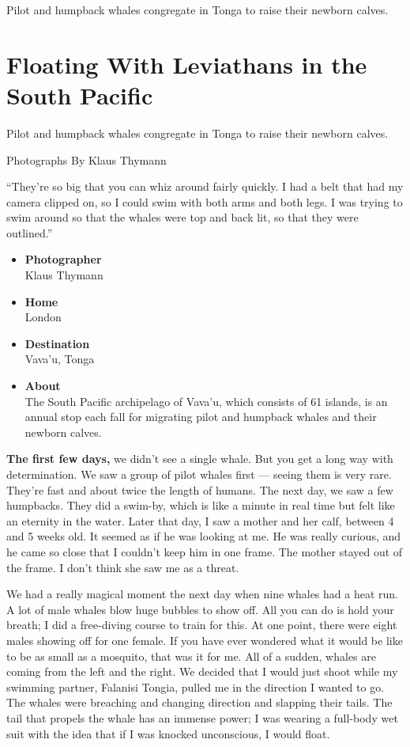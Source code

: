 Pilot and humpback whales congregate in Tonga to raise their newborn
calves.

\hypertarget{floating-with-leviathans-in-the-south-pacific-1}{%
\section{Floating With Leviathans in the South
Pacific}\label{floating-with-leviathans-in-the-south-pacific-1}}

Pilot and humpback whales congregate in Tonga to raise their newborn
calves.

Photographs By Klaus Thymann

``They're so big that you can whiz around fairly quickly. I had a belt
that had my camera clipped on, so I could swim with both arms and both
legs. I was trying to swim around so that the whales were top and back
lit, so that they were outlined.''~

\begin{itemize}
\tightlist
\item
  \textbf{Photographer}\\
  Klaus Thymann
\item
  \textbf{Home}\\
  London
\item
  \textbf{Destination}\\
  Vava'u, Tonga
\item
  \textbf{About}\\
  The South Pacific archipelago of Vava'u, which consists of 61 islands,
  is an annual stop each fall for migrating pilot and humpback whales
  and their newborn calves.
\end{itemize}

\textbf{The first few days,} we didn't see a single whale. But you get a
long way with determination. We saw a group of pilot whales first ---
seeing them is very rare. They're fast and about twice the length of
humans. The next day, we saw a few humpbacks. They did a swim-by, which
is like a minute in real time but felt like an eternity in the water.
Later that day, I saw a mother and her calf, between 4 and 5 weeks old.
It seemed as if he was looking at me. He was really curious, and he came
so close that I couldn't keep him in one frame. The mother stayed out of
the frame. I don't think she saw me as a threat.

We had a really magical moment the next day when nine whales had a heat
run. A lot of male whales blow huge bubbles to show off. All you can do
is hold your breath; I did a free-diving course to train for this. At
one point, there were eight males showing off for one female. If you
have ever wondered what it would be like to be as small as a mosquito,
that was it for me. All of a sudden, whales are coming from the left and
the right. We decided that I would just shoot while my swimming partner,
Falanisi Tongia, pulled me in the direction I wanted to go. The whales
were breaching and changing direction and slapping their tails. The tail
that propels the whale has an immense power; I was wearing a full-body
wet suit with the idea that if I was knocked unconscious, I would float.


